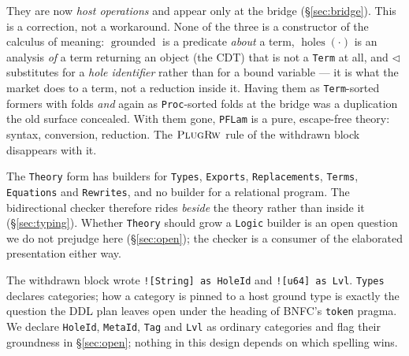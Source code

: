 \documentclass[11pt]{article}
\newcommand{\rul}[1]{\ensuremath{\textsc{#1}}}
\newcommand{\plug}{\mathbin{\triangleleft}}
\newcommand{\Holes}{\ensuremath{\operatorname{holes}}}
\newcommand{\grounded}{\ensuremath{\operatorname{grounded}}}
\begin{document}
\begin{description}[leftmargin=0pt,style=nextline,itemsep=4pt]
  \item[\texttt{grounded}, \texttt{holes}, \texttt{plug} were term formers carrying native folds.]
  They are now \emph{host operations} and appear only at the bridge (\S\ref{sec:bridge}). This is a
  correction, not a workaround. None of the three is a constructor of the calculus of meaning:
  $\grounded$ is a predicate \emph{about} a term, $\Holes(\cdot)$ is an analysis \emph{of} a term
  returning an object (the CDT) that is not a \texttt{Term} at all, and $\plug$ substitutes for a
  \emph{hole identifier} rather than for a bound variable --- it is what the market does to a term,
  not a reduction inside it. Having them as \texttt{Term}-sorted formers with folds \emph{and}
  again as \texttt{Proc}-sorted folds at the bridge was a duplication the old surface concealed.
  With them gone, \texttt{PFLam} is a pure, escape-free theory: syntax, conversion, reduction. The
  \rul{PlugRw} rule of the withdrawn block disappears with it.
  \item[The \texttt{logic \{ relation \dots \}} block.] The \texttt{Theory} form has builders for
  \texttt{Types}, \texttt{Exports}, \texttt{Replacements}, \texttt{Terms}, \texttt{Equations} and
  \texttt{Rewrites}, and no builder for a relational program. The bidirectional checker therefore
  rides \emph{beside} the theory rather than inside it (\S\ref{sec:typing}). Whether \texttt{Theory}
  should grow a \texttt{Logic} builder is an open question we do not prejudge here
  (\S\ref{sec:open}); the checker is a consumer of the elaborated presentation either way.
  \item[Ground categories written as native-type aliases.] The withdrawn block wrote
  \lstinline[language=mettail,basicstyle=\ttfamily\small]|![String] as HoleId| and
  \lstinline[language=mettail,basicstyle=\ttfamily\small]|![u64] as Lvl|. \texttt{Types} declares
  categories; how a category is pinned to a host ground type is exactly the question the DDL plan
  leaves open under the heading of BNFC's \texttt{token} pragma. We declare \texttt{HoleId},
  \texttt{MetaId}, \texttt{Tag} and \texttt{Lvl} as ordinary categories and flag their groundness in
  \S\ref{sec:open}; nothing in this design depends on which spelling wins.
\end{description}
\end{document}
